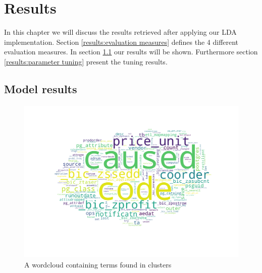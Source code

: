 \chapter{Results}
\label{ch:result}


In this chapter we will discuss the results retrieved after applying our LDA implementation. Section \ref{results:evaluation measures} defines the 4 different evaluation measures. In section \ref{results:modelresults} our results will be shown. Furthermore section \ref{results:parameter tuning} present the tuning results.

\section{Model results}\label{results:modelresults}


\begin{figure}[h]
    \centering
    \includegraphics[width=15cm, height=8cm]{figures/wc.png}
    \caption{A wordcloud containing terms found in clusters}
    \label{fig:worldcloud}
\end{figure}

